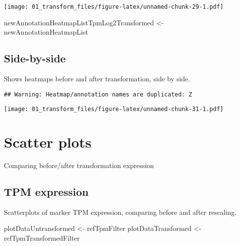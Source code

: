 \documentclass[
]{article}
\newenvironment{Shaded}{\begin{snugshade}}{\end{snugshade}}
\newcommand{\NormalTok}[1]{#1}
\newcommand{\OtherTok}[1]{\textcolor[rgb]{0.56,0.35,0.01}{#1}}
\newcommand{\SpecialCharTok}[1]{\textcolor[rgb]{0.81,0.36,0.00}{\textbf{#1}}}
\begin{document}
\texttt{[image: 01\_transform\_files/figure-latex/unnamed-chunk-29-1.pdf]}

\begin{Shaded}
\begin{Highlighting}[]
\NormalTok{newAnnotationHeatmapListTpmLog2Transformed }\OtherTok{\textless{}{-}}\NormalTok{ newAnnotationHeatmapList}
\end{Highlighting}
\end{Shaded}

\hypertarget{side-by-side-1}{%
\subsection{Side-by-side}\label{side-by-side-1}}

Shows heatmaps before and after transformation, side by side.

\begin{Shaded}
\end{Shaded}

\begin{verbatim}
## Warning: Heatmap/annotation names are duplicated: Z
\end{verbatim}

\texttt{[image: 01\_transform\_files/figure-latex/unnamed-chunk-31-1.pdf]}

\hypertarget{scatter-plots}{%
\section{Scatter plots}\label{scatter-plots}}

Comparing before/after transformation expression

\hypertarget{tpm-expression}{%
\subsection{TPM expression}\label{tpm-expression}}

Scatterplots of marker TPM expression, comparing before and after
rescaling.

\begin{Shaded}
\begin{Highlighting}[]
\NormalTok{plotDataUntransformed }\OtherTok{\textless{}{-}}\NormalTok{ refTpmFilter}
\NormalTok{plotDataTransformed }\OtherTok{\textless{}{-}}\NormalTok{ refTpmTransformedFilter}
\end{Highlighting}
\end{Shaded}
\end{document}
